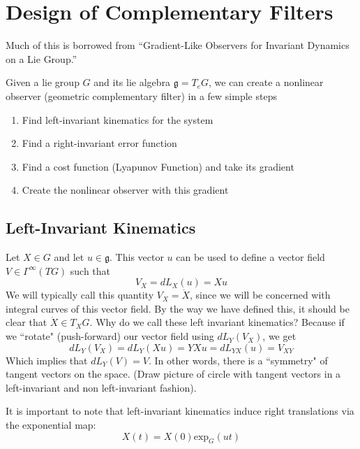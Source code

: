 \documentclass[a4paper]{article}
\begin{document}
\section*{Design of Complementary Filters}

Much of this is borrowed from ``Gradient-Like Observers for Invariant Dynamics on a Lie Group.''

Given a lie group $G$ and its lie algebra $\mathfrak{g} = T_eG$, we can create a nonlinear observer (geometric complementary filter) in a few simple steps

\begin{enumerate}
  \item Find left-invariant kinematics for the system
  \item Find a right-invariant error function 
  \item Find a cost function (Lyapunov Function) and take its gradient
  \item Create the nonlinear observer with this gradient
\end{enumerate}

\subsection*{Left-Invariant Kinematics}%
Let $X \in G$ and let $u \in \mathfrak{g}$. This vector $u$ can be used to define a vector field $V \in \Gamma^{\infty}(TG)$ such that
\[
  V_X = dL_X(u) = Xu
\]
We will typically call this quantity $V_X = \dot{X}$, since we will be concerned with integral curves of this vector field. By the way we have defined this, it should be clear that $\dot{X} \in T_XG$. Why do we call these left invariant kinematics? Because if we ``rotate" (push-forward) our vector field using $dL_Y(V_X)$, we get
\[
  dL_Y(V_X) = dL_Y(Xu) = YXu = dL_{YX}(u) = V_{XY}
\]
Which implies that $dL_Y(V) = V$. In other words, there is a ``symmetry" of tangent vectors on the space. (Draw picture of circle with tangent vectors in a left-invariant and non left-invariant fashion). 

It is important to note that left-invariant kinematics induce right translations via the exponential map: 
\[
  X(t) = X(0) \text{exp}_G \left(ut\right)
\]
\end{document}
